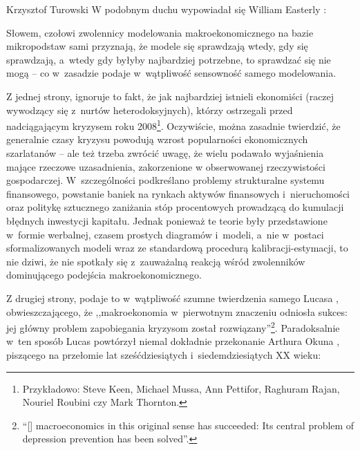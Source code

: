 \begin{artplenv}{Krzysztof Turowski}
W podobnym duchu wypowiadał się William Easterly
\parencite*{easterly_idiots_2009}:


Słowem, czołowi zwolennicy modelowania makroekonomicznego na bazie mikropodstaw sami przyznają, że modele się sprawdzają
wtedy, gdy się sprawdzają, a~wtedy gdy byłyby najbardziej potrzebne, to sprawdzać się nie mogą  --  co w~zasadzie
podaje w~wątpliwość sensowność samego modelowania.

Z jednej strony, ignoruje to fakt, że jak najbardziej istnieli ekonomiści (raczej wywodzący się z~nurtów
heterodoksyjnych), którzy ostrzegali przed nadciągającym kryzysem roku 2008\footnote{Przykładowo: Steve Keen, Michael
Mussa, Ann Pettifor, Raghuram Rajan, Nouriel Roubini czy Mark Thornton.}. Oczywiście, można zasadnie twierdzić, że
generalnie czasy kryzysu powodują wzrost popularności ekonomicznych szarlatanów
\parencite{robinson_second_1972}
 --  ale też trzeba zwrócić uwagę, że wielu podawało wyjaśnienia mające rzeczowe uzasadnienia, zakorzenione
w obserwowanej rzeczywistości gospodarczej. W~szczególności podkreślano problemy strukturalne systemu finansowego,
powstanie baniek na rynkach aktywów finansowych i~nieruchomości oraz politykę sztucznego zaniżania stóp procentowych
prowadzącą do kumulacji błędnych inwestycji kapitału. Jednak ponieważ te teorie były przedstawione w~formie werbalnej,
czasem prostych diagramów i~modeli, a~nie w~postaci sformalizowanych modeli wraz ze standardową procedurą
kalibracji-estymacji, to nie dziwi, że nie spotkały się z~zauważalną reakcją wśród zwolenników dominującego podejścia
makroekonomicznego.

Z drugiej strony, podaje to w~wątpliwość szumne twierdzenia samego Lucasa
\parencite[s.~1]{lucas_macroeconomic_2003},
obwieszczającego, że ,,makroekonomia w~pierwotnym znaczeniu odniosła sukces: jej główny problem zapobiegania kryzysom
został rozwiązany''\footnote{``[\mydots] macroeconomics in this original sense has succeeded: Its central problem of depression
prevention has been solved''.}. Paradoksalnie w~ten sposób Lucas powtórzył niemal dokładnie przekonanie Arthura Okuna
\parencite*{okun_political_1970},
piszącego na przełomie lat sześćdziesiątych i~siedemdziesiątych XX wieku:


\end{artplenv}
